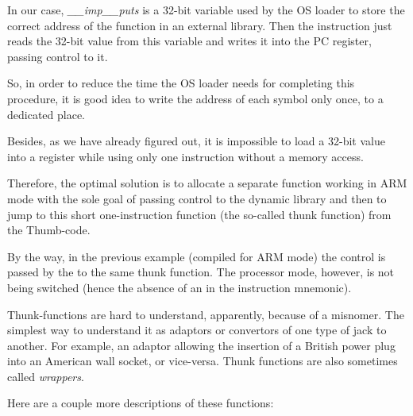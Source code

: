 In our case, \emph{\_\_imp\_\_puts} is a 32-bit variable used by the \ac{OS} loader to store the correct address of the function in an external library. 
Then the  instruction just reads the 32-bit value from this variable and writes it into the \ac{PC} register, passing control to it.

So, in order to reduce the time the \ac{OS} loader needs for completing this procedure, 
it is good idea to write the address of each symbol only once, to a dedicated place.

Besides, as we have already figured out, it is impossible to load a 32-bit value into a register 
while using only one instruction without a memory access.

Therefore, the optimal solution is to allocate a separate function working in ARM mode with the sole 
goal of passing control to the dynamic library and then to jump to this short one-instruction function (the so-called \gls{thunk function}) from the Thumb-code.

By the way, in the previous example (compiled for ARM mode) the control is passed by the  to the 
same \gls{thunk function}.
The processor mode, however, is not being switched (hence the absence of an  in the instruction mnemonic).


Thunk-functions are hard to understand, apparently, because of a misnomer.
The simplest way to understand it as adaptors or convertors of one type of jack to another.
For example, an adaptor allowing the insertion of a British power plug into an American wall socket, or vice-versa. 
Thunk functions are also sometimes called \emph{wrappers}.

Here are a couple more descriptions of these functions:

